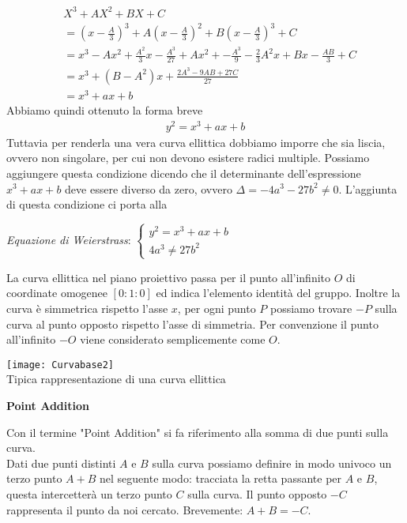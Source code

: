 \documentclass[a4paper,12pt]{tesiinfo}
\begin{document}
\begin{align*}
&X^3 + AX^2 + BX + C 
\\
&=\left(x- \frac{A}{3} \right )^3 +A\left ( x - \frac{A}{3} \right )^2 + B\left (x - \frac{A}{3} \right )^3 +C
\\
&= x^3-Ax^2 + \frac{A^2}{3}x - \frac{A^3}{27} + Ax^2 + - \frac{A^3}{9} -\frac{2}{3}A^2x + Bx - \frac{AB}{3} +C
\\
&= x^3 + (B-A^2)x + \frac{2A^3-9AB+27C}{27}
\\
&= x^3 + ax+b
\end{align*}
Abbiamo quindi ottenuto la forma breve
\begin{gather}
y^2 = x^3 + ax+b
\end{gather}
Tuttavia per renderla una vera curva ellittica dobbiamo imporre che sia liscia, ovvero non singolare, per cui non devono esistere radici multiple. Possiamo aggiungere questa condizione dicendo che il determinante dell'espressione $x^3 + ax+b$ deve essere diverso da zero, ovvero $\Delta = -4a^3 - 27b^2 \ne 0$. L'aggiunta di questa condizione ci porta alla
\begin{center}
\textit{Equazione di Weierstrass}:
$\begin{cases}
y^2 = x^3 + ax+b\\
4a^3 \ne 27b^2\end{cases}$
\end{center}
La curva ellittica nel piano proiettivo passa per il punto all'infinito $O$ di coordinate omogenee $[0:1:0]$ ed indica l'elemento identit\`a del gruppo. Inoltre la curva \`e simmetrica rispetto l'asse $x$, per ogni punto $P$ possiamo trovare $-P$ sulla curva al punto opposto rispetto l'asse di simmetria. Per convenzione il punto all'infinito $-O$ viene considerato semplicemente come $O$.
\begin{center}
\texttt{[image: Curvabase2]}
\\
Tipica rappresentazione di una curva ellittica
\\
\end{center}
\begin{center}
\textbf{Point Addition}
\end{center}
Con il termine "Point Addition" si fa riferimento alla somma di due punti sulla curva.
\\
Dati due punti distinti $A$ e $B$ sulla curva possiamo definire in modo univoco un terzo punto $A+B$ nel seguente modo: tracciata la retta passante per $A$ e $B$, questa intercetter\`a un terzo punto $C$ sulla curva. Il punto opposto $-C$ rappresenta il punto da noi cercato. Brevemente: $A + B = -C$.
\end{document}
